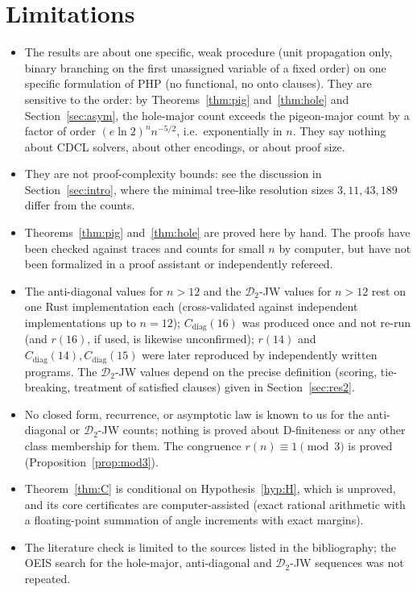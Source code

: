 \documentclass[11pt]{article}
\theoremstyle{definition}
\theoremstyle{remark}
\newcommand{\PHP}{\mathrm{PHP}}
\begin{document}
\section{Limitations}\label{sec:limits}
\begin{itemize}
\item The results are about one specific, weak procedure (unit propagation only, binary branching on the first unassigned variable of a fixed order) on one specific formulation of $\PHP$ (no functional, no onto clauses).
  They are sensitive to the order: by Theorems~\ref{thm:pig} and~\ref{thm:hole} and Section~\ref{sec:asym}, the hole-major count exceeds the pigeon-major count by a factor of order $(e\ln2)^n n^{-5/2}$, i.e.\ exponentially in $n$. They say nothing about CDCL solvers, about other encodings, or about proof size.
\item They are not proof-complexity bounds: see the discussion in Section~\ref{sec:intro}, where the minimal tree-like resolution sizes $3,11,43,189$ differ from the counts.
\item Theorems~\ref{thm:pig} and~\ref{thm:hole} are proved here by hand. The proofs have been checked against traces and counts for small $n$ by computer, but have not been formalized in a proof assistant or independently refereed.
\item The anti-diagonal values for $n>12$ and the $\mathcal D_2$-JW values for $n>12$ rest on one Rust implementation each (cross-validated against independent implementations up to $n=12$); $C_{\mathrm{diag}}(16)$ was produced once and not re-run (and $r(16)$, if used, is likewise unconfirmed); $r(14)$ and $C_{\mathrm{diag}}(14),C_{\mathrm{diag}}(15)$ were later reproduced by independently written programs. The
  $\mathcal D_2$-JW values depend on the precise definition (scoring, tie-breaking, treatment of satisfied clauses) given in Section~\ref{sec:res2}.
\item No closed form, recurrence, or asymptotic law is known to us for the anti-diagonal or $\mathcal D_2$-JW counts; nothing is proved about D-finiteness or any other class membership for them. The congruence $r(n)\equiv1\pmod3$ is proved (Proposition~\ref{prop:mod3}).
\item Theorem~\ref{thm:C} is conditional on Hypothesis~\ref{hyp:H}, which is unproved, and its core certificates are computer-assisted (exact rational arithmetic with a floating-point summation of angle increments with exact margins).
\item The literature check is limited to the sources listed in the bibliography; the OEIS search for the hole-major, anti-diagonal and $\mathcal D_2$-JW sequences was not repeated.
\end{itemize}
\end{document}
